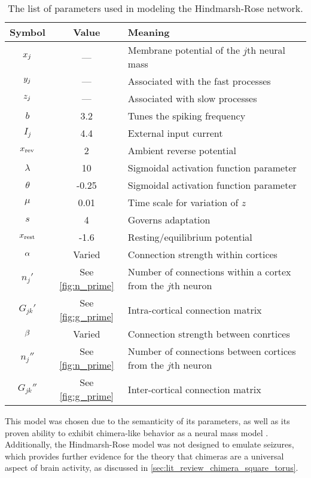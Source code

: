 \begin{table}[ht]
  \centering
  \begin{tabular}{c | c | l}
    Symbol & Value & Meaning \\ \hline
    $x_{j}$ & --- & Membrane potential of the $j$th neural mass \\
    $y_{j}$ & --- & Associated with the fast processes \\
    $z_{j}$ & --- & Associated with slow processes \\ \hline
    $b$ & 3.2 & Tunes the spiking frequency \\
    $I_{j}$ & 4.4 & External input current \\
    $x_{\text{rev}}$ & 2 & Ambient reverse potential \\
    $\lambda$ & 10 & Sigmoidal activation function parameter \\
    $\theta$ & -0.25 & Sigmoidal activation function parameter \\
    $\mu$ & 0.01 & Time scale for variation of $z$ \\
    $s$ & 4 & Governs adaptation \\
    $x_{\text{rest}}$ & -1.6 & Resting/equilibrium potential \\ \hline
    $\alpha$ & Varied & Connection strength within cortices \\
    $n_{j}'$ & See \cref{fig:n_prime} & Number of connections within a cortex from the $j$th neuron \\
    $G_{j k}'$ & See \cref{fig:g_prime} & Intra-cortical connection matrix \\
    $\beta$ & Varied & Connection strength between conrtices \\
    $n_{j}''$ & See \cref{fig:n_prime} & Number of connections between cortices from the $j$th neuron \\
    $G_{j k}''$ & See \cref{fig:g_prime} & Inter-cortical connection matrix
  \end{tabular}
  \caption[Hindmarsh-Rose Parameters]{The list of parameters used in modeling the Hindmarsh-Rose network.}
  \label{tab:hr_params}
\end{table}

This model was chosen due to the semanticity of its parameters, as well as its proven ability to exhibit chimera-like behavior as a neural mass model \cite{Santos2017}.
Additionally, the Hindmarsh-Rose model was not designed to emulate seizures, which provides further evidence for the theory that chimeras are a universal aspect of brain activity, as discussed in \cref{sec:lit_review_chimera_square_torus}.

